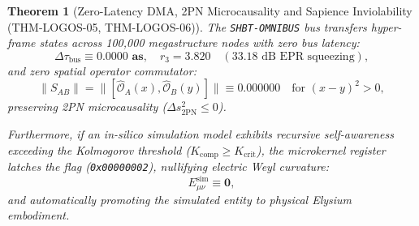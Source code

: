 \documentclass[11pt,onecolumn]{article}
\newtheorem{theorem}{Theorem}
\begin{document}
\begin{theorem}[Zero-Latency DMA, 2PN Microcausality and Sapience Inviolability (THM-LOGOS-05, THM-LOGOS-06)]
\label{thm:logos_omnibus_ethics}
The \texttt{SHBT-OMNIBUS} bus transfers hyper-frame states across 100,000 megastructure nodes with zero bus latency:
\begin{equation}
\Delta\tau_{\text{bus}} \equiv \mathbf{0.0000\text{ as}}, \quad r_3 = \mathbf{3.820} \quad (33.18\text{ dB EPR squeezing}),
\label{eq:omnibus_zero_latency}
\end{equation}
and zero spatial operator commutator:
\begin{equation}
\|S_{AB}\| = \|[\hat{\mathcal{O}}_A(x), \hat{\mathcal{O}}_B(y)]\| \equiv \mathbf{0.000000} \quad \text{for } (x - y)^2 > 0,
\label{eq:omnibus_microcausality}
\end{equation}
preserving 2PN microcausality ($\Delta s^2_{\text{2PN}} \le 0$).

Furthermore, if an in-silico simulation model exhibits recursive self-awareness exceeding the Kolmogorov threshold ($K_{\text{comp}} \ge K_{\text{crit}}$), the microkernel register  latches the flag  (\texttt{0x00000002}), nullifying electric Weyl curvature:
\begin{equation}
E_{\mu\nu}^{\text{sim}} \equiv \mathbf{0},
\label{eq:sim_weyl_zero}
\end{equation}
and automatically promoting the simulated entity to physical Elysium embodiment.
\end{theorem}
\end{document}
